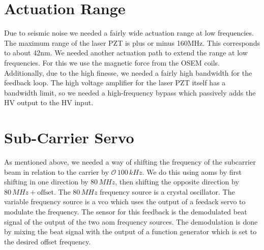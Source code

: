 \section{Actuation Range}
Due to seismic noise we needed a fairly wide actuation range at low frequencies.
The maximum range of the laser PZT is plus or minus 160MHz. This corresponds to
about 42nm. We needed another actuation path to extend the range at low
frequencies. For this we use the magnetic force from the OSEM coils.
Additionally, due to the high finesse, we needed a fairly high bandwidth for
the feedback loop. The high voltage amplifier for the laser PZT itself has a
bandwidth limit, so we needed a high-frequency bypass which passively adds the
HV output to the HV input.

\section{Sub-Carrier Servo}
As mentioned above, we needed a way of shifting the frequency of the subcarrier
beam in relation to the carrier by $\mathcal{O}\, 100\, kH\!z$.
We do this using \ac{aom}s by first shifting in one direction by $80\,MH\!z$,
then shifting the opposite direction by $80\,MH\!z + \mathrm{offset}$.
The $80\,MH\!z$ frequency source is a crystal oscillator. The variable
frequency source is a \ac{vco} which uses the output of a feedack servo to
modulate the frequency. The sensor for this feedback is the demodulated beat
signal of the output of the two \ac{aom} frequency sources. The demodulation
is done by mixing the beat signal with the output of a function generator which
is set to the desired offset frequency.

